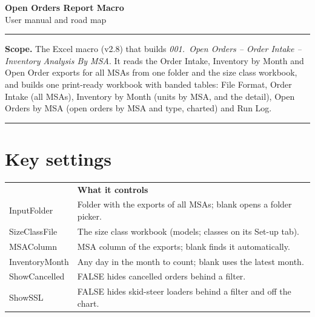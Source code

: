 \documentclass[11pt]{article}
\begin{document}
\begin{center}
  {\Large\bfseries Open Orders Report Macro}\\[0.35em]
  {\normalsize User manual and road map}
\end{center}

\vspace{-0.4em}
\noindent\rule{\linewidth}{0.8pt}

\vspace{0.2em}
\textbf{Scope.} The Excel macro (v2.8) that builds \textit{001.\ Open Orders -- Order Intake -- Inventory Analysis By MSA}. It reads the Order Intake, Inventory by Month and Open Order exports for all MSAs from one folder and the size class workbook, and builds one print-ready workbook with banded tables: File Format, Order Intake (all MSAs), Inventory by Month (units by MSA, and the detail), Open Orders by MSA (open orders by MSA and type, charted) and Run Log.

\vspace{-0.2em}
\noindent\rule{\linewidth}{0.4pt}

\section{Key settings}\label{sec:settings}
\begin{center}
\small
{}\label{tab:config}
\renewcommand{\arraystretch}{1.0}
\begin{tabularx}{\linewidth}{|>{\footnotesize\ttfamily\raggedright\arraybackslash}m{1.6in}|L|}
  \hline
   & \bfseries What it controls \\
  \hhline{|=|=|}
  InputFolder & Folder with the exports of all MSAs; blank opens a folder picker. \\
  \hline
  SizeClassFile & The size class workbook (models; classes on its Set-up tab). \\
  \hline
  MSAColumn & MSA column of the exports; blank finds it automatically. \\
  \hline
  InventoryMonth & Any day in the month to count; blank uses the latest month. \\
  \hline
  ShowCancelled & FALSE hides cancelled orders behind a filter. \\
  \hline
  ShowSSL & FALSE hides skid-steer loaders behind a filter and off the chart. \\
  \hline
\end{tabularx}
\end{center}
\end{document}
